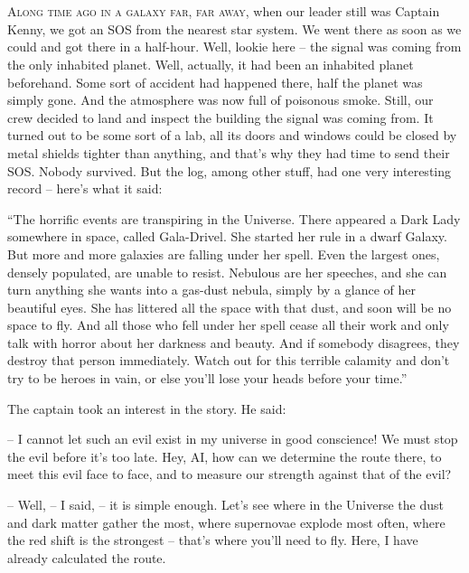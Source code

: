 \documentclass[ebook,twoside,final,openright]{memoir}
\begin{document}
\chapter{}
\par
\lettrine{A}{long time ago in a galaxy far, far away,} when our leader still was Captain Kenny, we got an SOS from the nearest star system. We went there as soon as we could and got there in a half-hour. Well, lookie here – the signal was coming from the only inhabited planet. Well, actually, it had been an inhabited planet beforehand. Some sort of accident had happened there, half the planet was simply gone. And the atmosphere was now full of poisonous smoke. Still, our crew decided to land and inspect the building the signal was coming from. It turned out to be some sort of a lab, all its doors and windows could be closed by metal shields tighter than anything, and that's why they had time to send their SOS. Nobody survived. But the log, among other stuff, had one very interesting record – here’s what it said:\par
\par
“The horrific events are transpiring in the Universe. There appeared a Dark Lady somewhere in space, called Gala-Drivel. She started her rule in a dwarf Galaxy. But more and more galaxies are falling under her spell. Even the largest ones, densely populated, are unable to resist. Nebulous are her speeches, and she can turn anything she wants into a gas-dust nebula, simply by a glance of her beautiful eyes. She has littered all the space with that dust, and soon will be no space to fly. And all those who fell under her spell cease all their work and only talk with horror about her darkness and beauty. And if somebody disagrees, they destroy that person immediately. Watch out for this terrible calamity and don’t try to be heroes in vain, or else you’ll lose your heads before your time.”\par
\par
The captain took an interest in the story. He said:\par
– I cannot let such an evil exist in my universe in good conscience! We must stop the evil before it’s too late. Hey, AI, how can we determine the route there, to meet this evil face to face, and to measure our strength against that of the evil?\par
– Well, – I said, – it is simple enough. Let's see where in the Universe the dust and dark matter gather the most, where supernovae explode most often, where the red shift is the strongest – that’s where you’ll need to fly. Here, I have already calculated the route.\par
\end{document}
